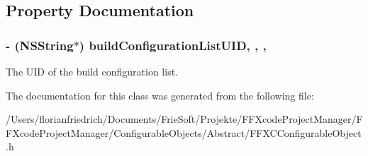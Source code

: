 \subsection{Property Documentation}
\hypertarget{interface_f_f_x_c_configurable_object_af8a83b598d2f7a3807615f4d1557850c}{
\subsubsection[{build\-Configuration\-List\-U\-I\-D}]{\setlength{\rightskip}{0pt plus 5cm}-\/ (N\-S\-String$\ast$) build\-Configuration\-List\-U\-I\-D\hspace{0.3cm}{\ttfamily [read]}, {\ttfamily [write]}, {\ttfamily [nonatomic]}, {\ttfamily [strong]}}}\label{interface_f_f_x_c_configurable_object_af8a83b598d2f7a3807615f4d1557850c}
The U\-I\-D of the build configuration list. 

The documentation for this class was generated from the following file\-:\begin{DoxyCompactItemize}
\item 
/\-Users/florianfriedrich/\-Documents/\-Frie\-Soft/\-Projekte/\-F\-F\-Xcode\-Project\-Manager/\-F\-F\-Xcode\-Project\-Manager/\-Configurable\-Objects/\-Abstract/F\-F\-X\-C\-Configurable\-Object.\-h\end{DoxyCompactItemize}
